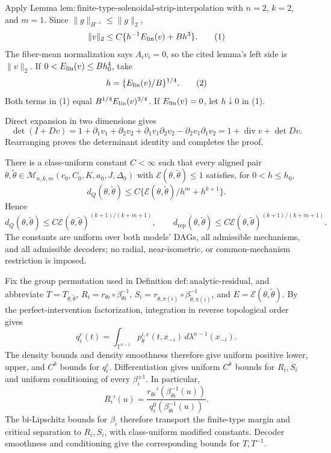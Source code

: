 Apply Lemma \(\mathrm{lem:finite\text{-}type\text{-}solenoidal\text{-}strip\text{-}interpolation}\) with \(n=2\), \(k=2\), and \(m=1\).  Since \(\lVert g\rVert_{H^{-1}}\leq\lVert g\rVert_2\),
\[
 \lVert v\rVert_2\leq C\{h^{-1}E_{\rm lin}(v)+Bh^3\}.
\tag{1}
\]
The fiber-mean normalization says \(A_iv_i=0\), so the cited lemma's left side is \(\lVert v\rVert_2\).  If \(0<E_{\rm lin}(v)\leq Bh_0^4\), take
\[
 h=\{E_{\rm lin}(v)/B\}^{1/4}.
\tag{2}
\]
Both terms in (1) equal \(B^{1/4}E_{\rm lin}(v)^{3/4}\).  If \(E_{\rm lin}(v)=0\), let \(h\downarrow0\) in (1).

Direct expansion in two dimensions gives
\[
 \det(I+Dv)=1+\partial_1v_1+\partial_2v_2+
 \partial_1v_1\partial_2v_2-
 \partial_2v_1\partial_1v_2
 =1+\operatorname {div}v+\det Dv.
\tag{3}
\]
Rearranging proves the determinant identity and completes the proof.

There is a class-uniform constant \(C<\infty\) such that every aligned pair \(\theta,\widetilde\theta\in\mathcal M_{n,k,m}(c_0,C_0,K,a_0,J,\Delta_0)\) with \(\mathcal E(\theta,\widetilde\theta)\leq1\) satisfies, for \(0<h\leq h_0\),
\[
 d_Q(\theta,\widetilde\theta)
 \leq C\{\mathcal E(\theta,\widetilde\theta)/h^m+h^{k+1}\}.
\]
Hence
\[
 d_Q(\theta,\widetilde\theta)
 \leq C\mathcal E(\theta,\widetilde\theta)^{(k+1)/(k+m+1)},
 \qquad
 d_{\mathrm{rep}}(\theta,\widetilde\theta)
 \leq C\mathcal E(\theta,\widetilde\theta)^{(k+1)/(k+m+1)}.
\]
The constants are uniform over both models' DAGs, all admissible mechanisms, and all admissible decoders; no radial, near-isometric, or common-mechanism restriction is imposed.

Fix the group permutation used in Definition \(\mathrm{def:analytic\text{-}residual}\), and abbreviate \(T=T_{\theta,\widetilde\theta}\), \(R_i=r_{\theta i}\circ\beta_{\theta i}^{-1}\), \(S_i=r_{\widetilde\theta,\pi(i)}\circ\beta_{\widetilde\theta,\pi(i)}^{-1}\), and \(E=\mathcal E(\theta,\widetilde\theta)\).  By the perfect-intervention factorization, integration in reverse topological order gives
\[
 q_i^e(t)=\int_{\mathbb T^{n-1}}p_\theta^{i,e}(t,x_{-i})\,d\lambda^{n-1}(x_{-i}).
\tag{1}
\]
The density bounds and density smoothness therefore give uniform positive lower, upper, and \(C^k\) bounds for \(q_i^e\).  Differentiation gives uniform \(C^k\) bounds for \(R_i,S_i\) and uniform conditioning of every \(\beta_i^{\pm1}\).  In particular,
\[
 R_i'(u)=\frac{r_{\theta i}'(\beta_{\theta i}^{-1}(u))}
 {q_i^0(\beta_{\theta i}^{-1}(u))}.
\]
The bi-Lipschitz bounds for \(\beta_i\) therefore transport the finite-type margin and critical separation to \(R_i,S_i\), with class-uniform modified constants.  Decoder smoothness and conditioning give the corresponding bounds for \(T,T^{-1}\).

